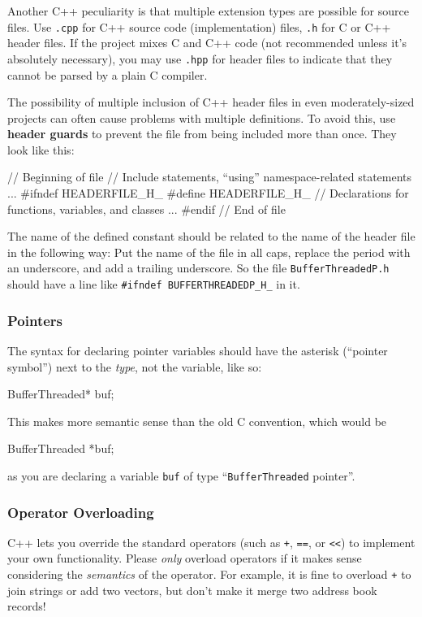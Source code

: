 \documentclass[12pt]{article}
\newcommand{\code}[1]{\texttt{#1}}
\newcommand{\textdef}[1]{\textbf{#1}}
\begin{document}
Another C++ peculiarity is that multiple extension types are possible for source files. Use \code{.cpp} for C++ source code (implementation) files, \code{.h} for C or C++ header files. If the project mixes C and C++ code (not recommended unless it's absolutely necessary), you may use \code{.hpp} for header files to indicate that they cannot be parsed by a plain C compiler.

The possibility of multiple inclusion of C++ header files in even moderately-sized projects can often cause problems with multiple definitions. To avoid this, use \textdef{header guards} to prevent the file from being included more than once. They look like this:
\begin{codeex}
// Beginning of file
// Include statements, ``using'' namespace-related statements
...
#ifndef HEADERFILE_H_
#define HEADERFILE_H_
// Declarations for functions, variables, and classes
...
#endif
// End of file
\end{codeex}
The name of the defined constant should be related to the name of the header file in the following way: Put the name of the file in all caps, replace the period with an underscore, and add a trailing underscore. So the file \code{BufferThreadedP.h} should have a line like \code{\#ifndef BUFFERTHREADEDP\_H\_} in it.

\subsubsection{Pointers}
The syntax for declaring pointer variables should have the asterisk (``pointer symbol'') next to the \emph{type}, not the variable, like so:
\begin{codeex}
BufferThreaded* buf;
\end{codeex}
This makes more semantic sense than the old C convention, which would be
\begin{codeex}
BufferThreaded *buf;
\end{codeex}
as you are declaring a variable \texttt{buf} of type ``\texttt{BufferThreaded} pointer''.

\subsubsection{Operator Overloading}
C++ lets you override the standard operators (such as \texttt{+}, \texttt{==}, or \texttt{<{}<}) to implement your own functionality. Please \emph{only} overload operators if it makes sense considering the \emph{semantics} of the operator. For example, it is fine to overload \texttt{+} to join strings or add two vectors, but don't make it merge two address book records!
\end{document}
